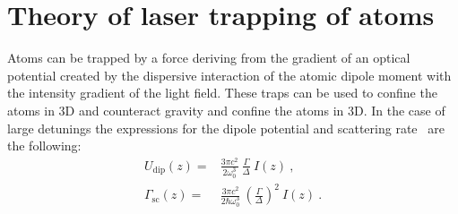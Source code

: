 
\chapter{\label{chap:dipole}Theory of laser trapping of atoms}


\ifpdf{}
    \graphicspath{{Chapter1/Figs/Raster/}{Chapter1/Figs/PDF/}{Chapter1/Figs/}}
\else
    \graphicspath{{Chapter1/Figs/Vector/}{Chapter1/Figs/}}
\fi

Atoms can be trapped by a force deriving from the gradient of an optical potential 
created by the dispersive interaction of the atomic dipole moment with the intensity 
gradient of the light field. These traps can be used to confine the atoms in 3D 
and counteract gravity and confine the atoms in 3D. In the case of large detunings 
the expressions for the dipole potential and scattering rate~\cite{grimm} are 
the following:
%
\begin{align}
    U_\mathrm{dip}(z) =& \frac{3\pi c^2}{2\omega_0^3}~\frac{\Gamma}{\Delta}~I(z)~, \label{eq:dipolepot_simple}\\
    \Gamma_{\mathrm{sc}}(z) =& \frac{3\pi c^2}{2\hbar\omega_0^3}~
    {\left ( \frac{\Gamma}{\Delta} \right )}^2~I(z)~.\label{eq:scattering_simple}
\end{align}


